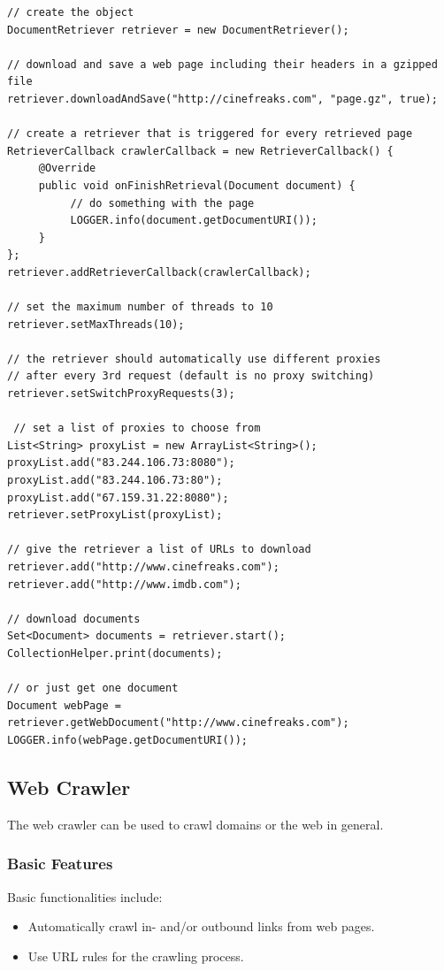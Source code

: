 \begin{codelisting}
\begin{lstlisting}[caption=Using the web crawler.,frame=tb]
// create the object
DocumentRetriever retriever = new DocumentRetriever();
   
// download and save a web page including their headers in a gzipped file
retriever.downloadAndSave("http://cinefreaks.com", "page.gz", true);
   
// create a retriever that is triggered for every retrieved page
RetrieverCallback crawlerCallback = new RetrieverCallback() {
     @Override
     public void onFinishRetrieval(Document document) {
          // do something with the page
          LOGGER.info(document.getDocumentURI());
     }
};
retriever.addRetrieverCallback(crawlerCallback);
   
// set the maximum number of threads to 10
retriever.setMaxThreads(10);
   
// the retriever should automatically use different proxies
// after every 3rd request (default is no proxy switching)
retriever.setSwitchProxyRequests(3);
   
 // set a list of proxies to choose from
List<String> proxyList = new ArrayList<String>();
proxyList.add("83.244.106.73:8080");
proxyList.add("83.244.106.73:80");
proxyList.add("67.159.31.22:8080");
retriever.setProxyList(proxyList);
        
// give the retriever a list of URLs to download
retriever.add("http://www.cinefreaks.com");
retriever.add("http://www.imdb.com");
        
// download documents
Set<Document> documents = retriever.start();
CollectionHelper.print(documents);
     
// or just get one document
Document webPage = retriever.getWebDocument("http://www.cinefreaks.com");
LOGGER.info(webPage.getDocumentURI());
\end{lstlisting}
\end{codelisting}

\subsection{Web Crawler}
The web crawler can be used to crawl domains or the web in general.

\subsubsection{Basic Features}
Basic functionalities include:
\begin{itemize}
\item Automatically crawl in- and/or outbound links from web pages.
\item Use URL rules for the crawling process.
\end{itemize}

